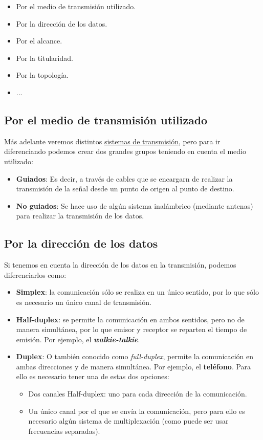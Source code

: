 \begin{itemize}
    \item Por el medio de transmisión utilizado.
    \item Por la dirección de los datos.
    \item Por el alcance.
    \item Por la titularidad.
    \item Por la topología.
    \item ...
\end{itemize}

\subsection{Por el medio de transmisión utilizado}
Más adelante veremos distintos \hyperlink{sistemas_transmision}{sistemas de transmisión}, pero para ir diferenciando podemos crear dos grandes grupos teniendo en cuenta el medio utilizado:

\begin{itemize}
    \item \textbf{Guiados}: Es decir, a través de cables que se encargarn de realizar la transmisión de la señal desde un punto de origen al punto de destino.

    \item \textbf{No guiados}: Se hace uso de algún sistema inalámbrico (mediante antenas) para realizar la transmisión de los datos.
\end{itemize}


\subsection{Por la dirección de los datos}
Si tenemos en cuenta la dirección de los datos en la transmisión, podemos diferenciarlos como:

\begin{itemize}
    \item \textbf{Simplex}: la comunicación sólo se realiza en un único sentido, por lo que sólo es necesario un único canal de transmisión.

    \item \textbf{Half-duplex}: se permite la comunicación en ambos sentidos, pero no de manera simultánea, por lo que emisor y receptor se reparten el tiempo de emisión. Por ejemplo, el \textit{\textbf{walkie-talkie}}.

    \item \textbf{Duplex}: O también conocido como \textit{full-duplex}, permite la comunicación en ambas direcciones y de manera simultánea. Por ejemplo, el \textbf{teléfono}. Para ello es necesario tener una de estas dos opciones:
    \begin{itemize}
        \item Dos canales Half-duplex: uno para cada dirección de la comunicación.
        \item Un único canal por el que se envía la comunicación, pero para ello es necesario algún sistema de multiplexación (como puede ser usar frecuencias separadas).
    \end{itemize}
\end{itemize}


